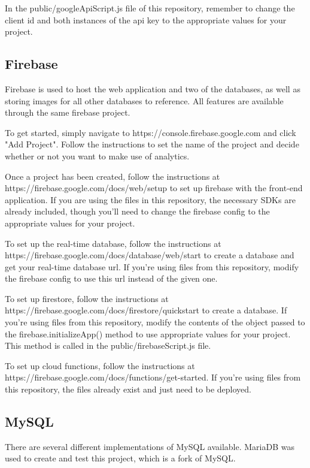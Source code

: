 \documentclass[letterpaper]{article}
\begin{document}
In the public/googleApiScript.js file of this repository, remember to change the client id and both instances of the api key to the appropriate values for your project.

\subsection{Firebase}

Firebase is used to host the web application and two of the databases, as well as storing images for all other databases to reference.
All features are available through the same firebase project.

To get started, simply navigate to https://console.firebase.google.com and click "Add Project".
Follow the instructions to set the name of the project and decide whether or not you want to make use of analytics.

Once a project has been created, follow the instructions at https://firebase.google.com/docs/web/setup to set up firebase with the front-end application.
If you are using the files in this repository, the necessary SDKs are already included, though you'll need to change the firebase config to the appropriate values for your project.

To set up the real-time database, follow the instructions at https://firebase.google.com/docs/database/web/start to create a database and get your real-time database url.
If you're using files from this repository, modify the firebase config to use this url instead of the given one.

To set up firestore, follow the instructions at https://firebase.google.com/docs/firestore/quickstart to create a database.
If you're using files from this repository, modify the contents of the object passed to the firebase.initializeApp() method to use appropriate values for your project.
This method is called in the public/firebaseScript.js file.

To set up cloud functions, follow the instructions at https://firebase.google.com/docs/functions/get-started.
If you're using files from this repository, the files already exist and just need to be deployed.

\subsection{MySQL}

There are several different implementations of MySQL available.
MariaDB was used to create and test this project, which is a fork of MySQL.
\end{document}
